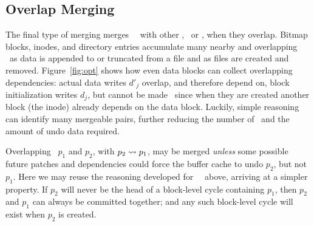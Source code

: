 \subsection{Overlap Merging}
\label{sec:patches:merge:overlap}

The final type of merging merges \rb\ \patches\ with other \patches,
\nrb\ or \rb, when they overlap.
%
Bitmap blocks, inodes, and directory entries accumulate many nearby
and overlapping \patches\ as data is appended to or truncated from a
file and as files are created and removed.
%
Figure~\ref{fig:opt} shows how even data blocks can collect overlapping
dependencies: actual data writes $d'_j$ overlap, and therefore depend on,
block initialization writes $d_j$, but cannot be made \nrb\ since when they
are created another block (the inode) already depends on the data block.
%
Luckily, simple reasoning can identify many mergeable pairs,
further reducing the number of \patches\ and the amount of undo data
required.


Overlapping \patches\ $p_1$ and $p_2$, with $p_2 \leadsto p_1$, may be
merged \emph{unless} some possible future patches and dependencies could
force the buffer cache to undo $p_2$, but not $p_1$.
%
Here we may reuse the reasoning developed for \nrb\ \patches\ above,
arriving at a simpler property.
%
If $p_2$ will never be the head of a block-level cycle containing $p_1$,
then $p_2$ and $p_1$ can always be committed together; and any such
block-level cycle will exist when $p_2$ is created.

